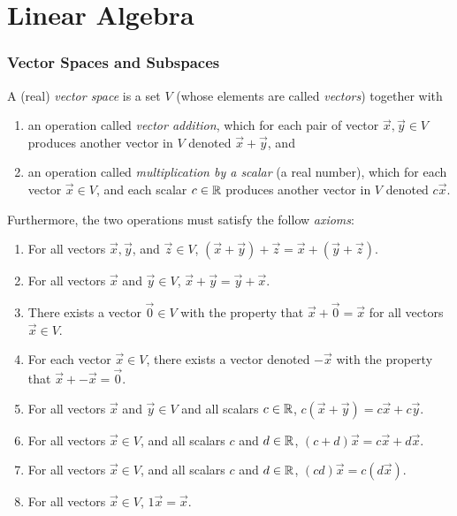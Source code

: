 \part*{Linear Algebra}

\section*{Vector Spaces and Subspaces}

\begin{definition}
	A (real) \emph{vector space} is a set $V$ (whose elements are called
	\emph{vectors}) together with
	\begin{enumerate}
		\item an operation called \emph{vector addition}, which for each pair of
			vector $\vec{x}, \vec{y} \in V$ produces another vector in $V$ denoted
			$\vec{x} + \vec{y}$, and
		\item an operation called \emph{multiplication by a scalar} (a real number),
			which for each vector $\vec{x} \in V$, and each scalar $c \in {\mathbb{R}}$
			produces another vector in $V$ denoted $c \vec{x}$.
	\end{enumerate}
	Furthermore, the two operations must satisfy the follow \emph{axioms}:
	\begin{enumerate}
		\item For all vectors $\vec{x}, \vec{y}$, and $\vec{z} \in V$, $(\vec{x}
			+ \vec{y}) + \vec{z} = \vec{x} + (\vec{y} + \vec{z})$.
		\item For all vectors $\vec{x}$ and $\vec{y} \in V$, $\vec{x} + \vec{y}
			= \vec{y} + \vec{x}$.
		\item There exists a vector $\vec{0} \in V$ with the property that
			$\vec{x} + \vec{0} = \vec{x}$ for all vectors $\vec{x} \in V$.
		\item For each vector $\vec{x} \in V$, there exists a vector denoted
			$-\vec{x}$ with the property that $\vec{x} + -\vec{x} = \vec{0}$.
		\item For all vectors $\vec{x}$ and $\vec{y} \in V$ and all scalars $c \in
			{\mathbb{R}}$, $c(\vec{x} + \vec{y}) = c\vec{x} + c\vec{y}$.
		\item For all vectors $\vec{x} \in V$, and all scalars $c$ and $d \in {\mathbb{R}}$,
			$(c + d)\vec{x} = c\vec{x} + d\vec{x}$.
		\item For all vectors $\vec{x} \in V$, and all scalars $c$ and $d \in {\mathbb{R}}$,
			$(cd)\vec{x} = c(d\vec{x})$.
		\item For all vectors $\vec{x} \in V$, $1\vec{x} = \vec{x}$.
	\end{enumerate}
\end{definition}


